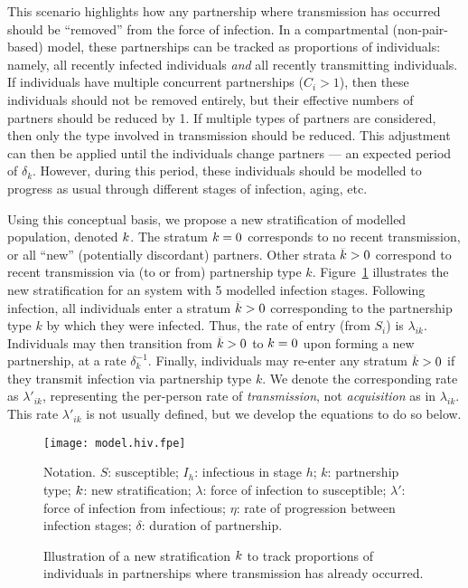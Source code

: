 \par
This scenario highlights how any partnership where transmission has occurred
should be ``removed'' from the force of infection.
In a compartmental (non-pair-based) model,
these partnerships can be tracked as proportions of individuals:
namely, all recently infected individuals \emph{and} all recently transmitting individuals.
If individuals have multiple concurrent partnerships ($C_{i} > 1$),
then these individuals should not be removed entirely,
but their effective numbers of partners should be reduced by 1.
If multiple types of partners are considered,
then only the type involved in transmission should be reduced.
This adjustment can then be applied until the individuals change partners
--- an expected period of $\delta_k$.
However, during this period, these individuals should be modelled
to progress as usual through different stages of infection, aging, etc.
\par
Using this conceptual basis,
we propose a new stratification of modelled population, denoted $\k$.
The stratum $\k = 0$ corresponds to no recent transmission,
or all ``new'' (potentially discordant) partners.
Other strata $\k > 0$ correspond to recent transmission via (to or from) partnership type $k$.
Figure~\ref{fig:model.hk} illustrates the new stratification
for an system with 5 modelled infection stages.
Following infection, all individuals enter a stratum $\k > 0$
corresponding to the partnership type $k$ by which they were infected.
Thus, the rate of entry (from $S_i$) is $\lambda_{ik}$.
Individuals may then transition from $\k > 0$ to $\k = 0$
upon forming a new partnership, at a rate $\delta_k^{-1}$.
Finally, individuals may re-enter any stratum $\k > 0$
if they transmit infection via partnership type $k$.
We denote the corresponding rate as $\lambda'_{ik}$,
representing the per-person rate of \emph{transmission},
not \emph{acquisition} as in $\lambda_{ik}$.
This rate $\lambda'_{ik}$ is not usually defined,
but we develop the equations to do so below.
\begin{figure}
  \centerline{\texttt{[image: model.hiv.fpe]}}
  \caption{Illustration of a new stratification $\k$ to track
    proportions of individuals in partnerships where transmission has already occurred.}
  \label{fig:model.hk}
  \floatfoot
  Notation.
  $S$: susceptible;
  $I_h$: infectious in stage $h$;
  $k$: partnership type;
  $\k$: new stratification;
  $\lambda$: force of infection to susceptible;
  $\lambda'$: force of infection from infectious;
  $\eta$: rate of progression between infection stages;
  $\delta$: duration of partnership.
\end{figure}
